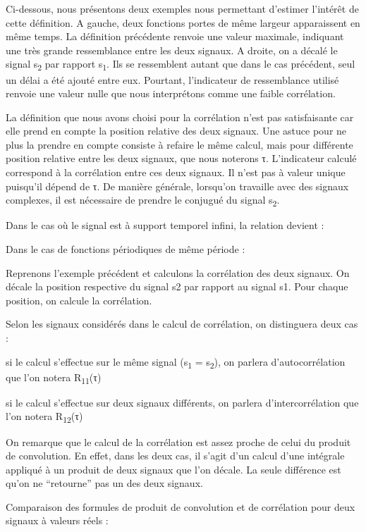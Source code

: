 \documentclass[]{article}
\begin{document}
Ci-dessous, nous présentons deux exemples nous permettant d'estimer
l'intérêt de cette définition. A gauche, deux fonctions portes de même
largeur apparaissent en même temps. La définition précédente renvoie une
valeur maximale, indiquant une très grande ressemblance entre les deux
signaux. A droite, on a décalé le signal s\textsubscript{2} par rapport
s\textsubscript{1}. Ils se ressemblent autant que dans le cas précédent,
seul un délai a été ajouté entre eux. Pourtant, l'indicateur de
ressemblance utilisé renvoie une valeur nulle que nous interprétons
comme une faible corrélation.

La définition que nous avons choisi pour la corrélation n'est pas
satisfaisante car elle prend en compte la position relative des deux
signaux. Une astuce pour ne plus la prendre en compte consiste à refaire
le même calcul, mais pour différente position relative entre les deux
signaux, que nous noterons τ. L'indicateur calculé correspond à la
corrélation entre ces deux signaux. Il n'est pas à valeur unique
puisqu'il dépend de τ. De manière générale, lorsqu'on travaille avec des
signaux complexes, il est nécessaire de prendre le conjugué du signal
s\textsubscript{2}.

Dans le cas où le signal est à support temporel infini, la relation
devient :

Dans le cas de fonctions périodiques de même période :~

Reprenons l'exemple précédent et calculons la corrélation des deux
signaux. On décale la position respective du signal s2 par rapport au
signal s1. Pour chaque position, on calcule la corrélation.

Selon les signaux considérés dans le calcul de corrélation, on
distinguera deux cas :

si le calcul s'effectue sur le même signal (s\textsubscript{1} =
s\textsubscript{2}), on parlera d'autocorrélation que l'on notera
R\textsubscript{11}(τ)

si le calcul s'effectue sur deux signaux différents, on parlera
d'intercorrélation que l'on notera R\textsubscript{12}(τ)

On remarque que le calcul de la corrélation est assez proche de celui du
produit de convolution. En effet, dans les deux cas, il s'agit d'un
calcul d'une intégrale appliqué à un produit de deux signaux que l'on
décale. La seule différence est qu'on ne ``retourne'' pas un des deux
signaux.~ ~

Comparaison des formules de produit de convolution et de corrélation
pour deux signaux à valeurs réels :
\end{document}
